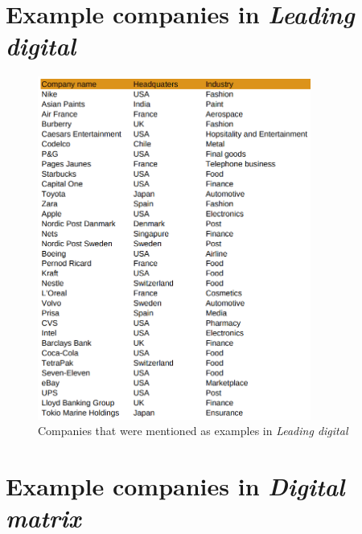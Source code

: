 \documentclass[a4]{scrartcl}
\begin{document}
	
	\newpage
	\begin{spacing}{0.9}
		\printbibliography
	\end{spacing}



\appendix
\newpage
\section{Example companies in \textit{Leading digital}} \label{a:LD}


\begin{figure}[h!]
	\centering
	\includegraphics[width=0.8\textwidth]{images/LD_Table.png}
	\caption{Companies that were mentioned as examples in \textit{Leading digital} \cite{leadingdigital}}
	\label{fig:LD_table}
\end{figure}
	
	
	
	
	
	




\newpage
\section{Example companies in \textit{Digital matrix}} \label{b:DM}
\end{document}
